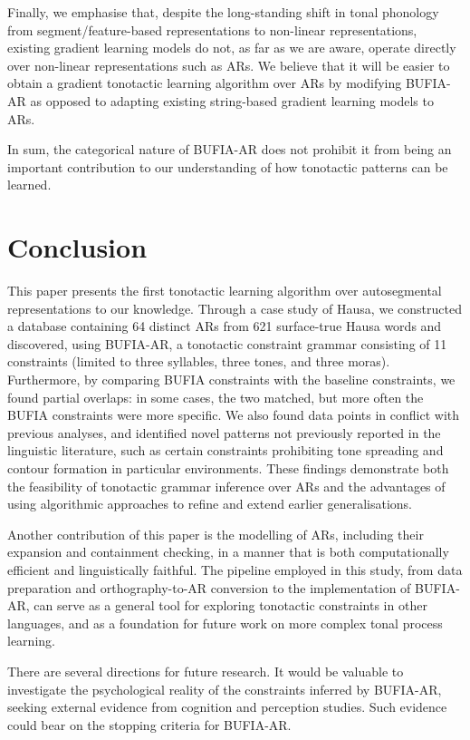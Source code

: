 Finally, we emphasise that, despite the long-standing
shift in tonal phonology from segment/feature-based representations to
non-linear representations, existing gradient learning models do not,
as far as we are aware, operate directly over non-linear
representations such as ARs. We believe that it will be easier to
obtain a gradient tonotactic learning algorithm over ARs by modifying
BUFIA-AR as opposed to adapting existing string-based gradient
learning models to ARs.

In sum, the categorical nature of BUFIA-AR does not prohibit it from
being an important contribution to our understanding of how tonotactic
patterns can be learned.

\section{Conclusion}
\label{sec:conclusion}
This paper presents the first tonotactic learning algorithm over
autosegmental representations to our knowledge. Through a case study
of Hausa, we constructed a database containing 64 distinct ARs from
621 surface-true Hausa words and discovered, using BUFIA-AR, a
tonotactic constraint grammar consisting of 11 constraints (limited to
three syllables, three tones, and three moras). Furthermore, by
comparing BUFIA constraints with the baseline constraints, we found
partial overlaps: in some cases, the two matched, but more often the
BUFIA constraints were more specific. We also found data points in
conflict with previous analyses, and identified novel patterns not
previously reported in the linguistic literature, such as certain
constraints prohibiting tone spreading and contour formation in
particular environments. These findings demonstrate both the
feasibility of tonotactic grammar inference over ARs and the
advantages of using algorithmic approaches to refine and extend
earlier generalisations.

Another contribution of this paper is the modelling of ARs, including
their expansion and containment checking, in a manner that is both
computationally efficient and linguistically faithful. The pipeline 
employed in this study, from data preparation and orthography-to-AR 
conversion to the implementation of BUFIA-AR, can serve as a general 
tool for exploring tonotactic constraints in other languages, and as 
a foundation for future work on more complex tonal process learning.

There are several directions for future research. It would be valuable
to investigate the psychological reality of the constraints inferred
by BUFIA-AR, seeking external evidence from cognition and perception
studies. Such evidence could bear on the stopping criteria for
BUFIA-AR.


